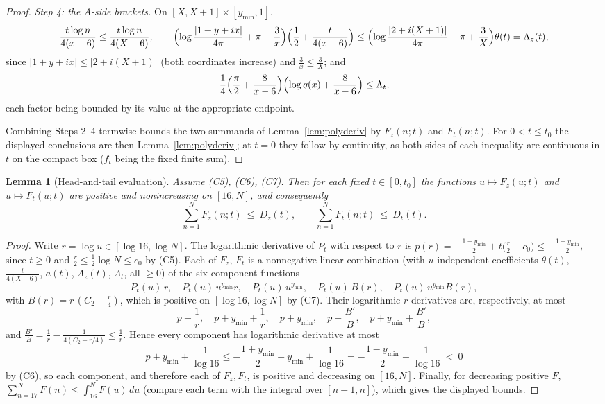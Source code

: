 \documentclass[11pt]{article}
\newtheorem{lemma}[theorem]{Lemma}
\theoremstyle{definition}
\begin{document}
\begin{proof}
\emph{Step 4: the $A$-side brackets.} On $[X,X+1]\times[y_{\min},1]$,
\[
\frac{t\log n}{4(x-6)}\le\frac{t\log n}{4(X-6)},
\qquad
\Bigl(\log\frac{|1+y+ix|}{4\pi}+\pi+\frac3x\Bigr)
\Bigl(\frac12+\frac t{4(x-6)}\Bigr)
\le\Bigl(\log\frac{|2+i(X+1)|}{4\pi}+\pi+\frac3X\Bigr)
\theta(t)=\Lambda_z(t),
\]
since $|1+y+ix|\le|2+i(X+1)|$ (both coordinates increase) and
$\frac3x\le\frac3X$; and
\[
\frac14\Bigl(\frac\pi2+\frac8{x-6}\Bigr)
\Bigl(\log q(x)+\frac8{x-6}\Bigr)\le\Lambda_t,
\]
each factor being bounded by its value at the appropriate endpoint.

Combining Steps 2--4 termwise bounds the two summands of
Lemma~\ref{lem:polyderiv} by $F_z(n;t)$ and $F_t(n;t)$. For
$0<t\le t_0$ the displayed conclusions are then
Lemma~\ref{lem:polyderiv}; at $t=0$ they follow by continuity, as
both sides of each inequality are continuous in $t$ on the compact
box ($f_t$ being the fixed finite sum).
\end{proof}

\begin{lemma}[Head-and-tail evaluation]\label{lem:headtail}
Assume (C5), (C6), (C7). Then for each fixed $t\in[0,t_0]$ the
functions $u\mapsto F_z(u;t)$ and $u\mapsto F_t(u;t)$ are positive
and nonincreasing on $[16,N]$, and consequently
\[
\sum_{n=1}^{N}F_z(n;t)\ \le\ D_z(t),
\qquad
\sum_{n=1}^{N}F_t(n;t)\ \le\ D_t(t).
\]
\end{lemma}

\begin{proof}
Write $r=\log u\in[\log16,\log N]$. The logarithmic derivative of
$P_t$ with respect to $r$ is
$p(r)=-\frac{1+y_{\min}}2+t\bigl(\frac r2-c_0\bigr)
\le-\frac{1+y_{\min}}2$, since $t\ge0$ and
$\frac r2\le\frac12\log N\le c_0$ by (C5). Each of $F_z$, $F_t$ is
a nonnegative linear combination (with $u$-independent
coefficients $\theta(t)$, $\frac t{4(X-6)}$, $a(t)$,
$\Lambda_z(t)$, $\Lambda_t$, all $\ge0$) of the six component
functions
\[
P_t(u)\,r,\quad P_t(u)\,u^{y_{\min}}r,\quad
P_t(u)\,u^{y_{\min}},\quad
P_t(u)\,B(r),\quad P_t(u)\,u^{y_{\min}}B(r),
\]
with $B(r)=r\,(C_2-\frac r4)$, which is positive on
$[\log16,\log N]$ by (C7). Their logarithmic $r$-derivatives are,
respectively, at most
\[
p+\frac1r,\quad p+y_{\min}+\frac1r,\quad p+y_{\min},\quad
p+\frac{B'}B,\quad p+y_{\min}+\frac{B'}B,
\]
and $\frac{B'}B=\frac1r-\frac1{4(C_2-r/4)}\le\frac1r$. Hence every
component has logarithmic derivative at most
\[
p+y_{\min}+\frac1{\log16}
\le-\frac{1+y_{\min}}2+y_{\min}+\frac1{\log16}
=-\frac{1-y_{\min}}2+\frac1{\log16}\ <\ 0
\]
by (C6), so each component, and therefore each of $F_z,F_t$, is
positive and decreasing on $[16,N]$. Finally, for decreasing
positive $F$,
$\sum_{n=17}^{N}F(n)\le\int_{16}^{N}F(u)\,du$ (compare each term
with the integral over $[n-1,n]$), which gives the displayed
bounds.
\end{proof}
\end{document}
